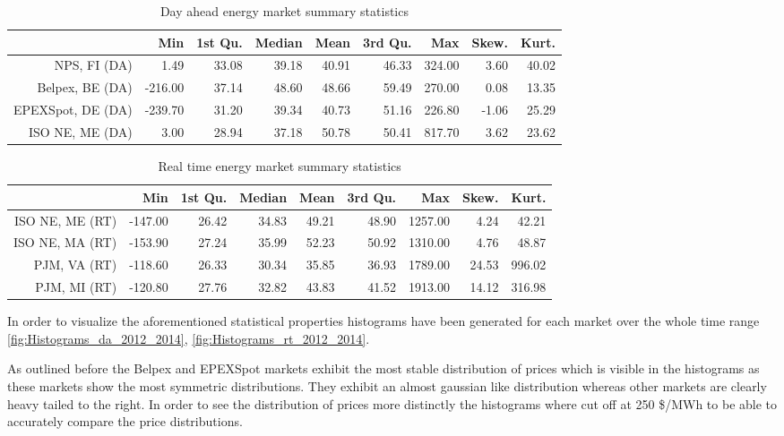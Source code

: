 \begin{table}[ht]
\centering
\begin{tabular}{rrrrrrrrr}
  \hline
 & Min & 1st Qu. & Median & Mean & 3rd Qu. & Max & Skew. & Kurt. \\ 
  \hline
NPS, FI (DA) & 1.49 & 33.08 & 39.18 & 40.91 & 46.33 & 324.00 & 3.60 & 40.02 \\ 
  Belpex, BE (DA) & -216.00 & 37.14 & 48.60 & 48.66 & 59.49 & 270.00 & 0.08 & 13.35 \\ 
  EPEXSpot, DE (DA) & -239.70 & 31.20 & 39.34 & 40.73 & 51.16 & 226.80 & -1.06 & 25.29 \\ 
  ISO NE, ME (DA) & 3.00 & 28.94 & 37.18 & 50.78 & 50.41 & 817.70 & 3.62 & 23.62 \\ 
   \hline
\end{tabular}
\caption{Day ahead energy market summary statistics}
\label{table:day_ahead_market_summary}
\end{table}
\begin{table}[ht]
\centering
\begin{tabular}{rrrrrrrrr}
  \hline
 & Min & 1st Qu. & Median & Mean & 3rd Qu. & Max & Skew. & Kurt. \\ 
  \hline
ISO NE, ME (RT) & -147.00 & 26.42 & 34.83 & 49.21 & 48.90 & 1257.00 & 4.24 & 42.21 \\ 
  ISO NE, MA (RT) & -153.90 & 27.24 & 35.99 & 52.23 & 50.92 & 1310.00 & 4.76 & 48.87 \\ 
  PJM, VA (RT) & -118.60 & 26.33 & 30.34 & 35.85 & 36.93 & 1789.00 & 24.53 & 996.02 \\ 
  PJM, MI (RT) & -120.80 & 27.76 & 32.82 & 43.83 & 41.52 & 1913.00 & 14.12 & 316.98 \\ 
   \hline
\end{tabular}
\caption{Real time energy market summary statistics}
\label{table:real_time_market_summary}
\end{table}


In order to visualize the aforementioned statistical properties histograms have been generated for each market over the whole time range \ref{fig:Histograms_da_2012_2014}, \ref{fig:Histograms_rt_2012_2014}. 

As outlined before the Belpex and EPEXSpot markets exhibit the most stable distribution of prices which is visible in the histograms as these markets show the most symmetric distributions. They exhibit an almost gaussian like distribution whereas other markets are clearly heavy tailed to the right. In order to see the distribution of prices more distinctly the histograms where cut off at 250 \$/MWh to be able to accurately compare the price distributions. 




